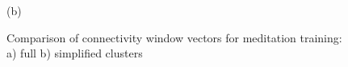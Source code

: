 \begin{figure}[h!]
\begin{minipage}[h]{0.5\linewidth}
 (b) \\
\end{minipage}
\caption{Comparison of connectivity window vectors for meditation training: a) full b) simplified clusters} 
\end{figure}


